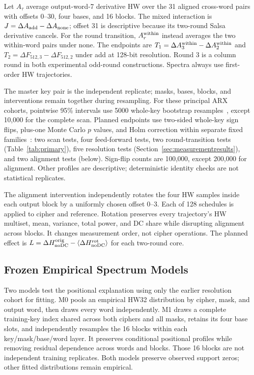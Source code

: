 \documentclass[electronics,article,submit,pdftex,oneauthor]{Definitions/mdpi}
\begin{document}
Let $A_\tau$ average output-word-7 derivative HW over the 31 aligned cross-word pairs with offsets 0--30, four bases, and 16 blocks. The mixed interaction is $J=\Delta A_{\rm add}-\Delta A_{\rm none}$; offset 31 is descriptive because its two-round Salsa derivative cancels. For the round transition, $A_r^{\rm within}$ instead averages the two within-word pairs under none. The endpoints are $T_1=\Delta A_3^{\rm within}-\Delta A_2^{\rm within}$ and $T_2=\Delta F_{512,3}-\Delta F_{512,2}$ under add at 128-bit resolution. Round 3 is a column round in both experimental odd-round constructions. Spectra always use first-order HW trajectories.

The master key pair is the independent replicate; masks, bases, blocks, and interventions remain together during resampling. For these principal ARX cohorts, pointwise 95\% intervals use 5000 whole-key bootstrap resamples~\citep{field2007}, except 10,000 for the complete scan. Planned endpoints use two-sided whole-key sign flips, plus-one Monte Carlo $p$ values, and Holm correction within separate fixed families~\citep{holm1979}: two scan tests, four feed-forward tests, two round-transition tests (Table~\ref{tab:primary}), five resolution tests (Section~\ref{sec:measurementresults}), and two alignment tests (below). Sign-flip counts are 100,000, except 200,000 for alignment. Other profiles are descriptive; deterministic identity checks are not statistical replicates.

The alignment intervention independently rotates the four HW samples inside each output block by a uniformly chosen offset 0--3. Each of 128 schedules is applied to cipher and reference. Rotation preserves every trajectory's HW multiset, mean, variance, total power, and DC share while disrupting alignment across blocks. It changes measurement order, not cipher operations. The planned effect is $L=\Delta H_{\rm noDC}^{\rm orig}-\langle\Delta H_{\rm noDC}^{\rm rot}\rangle$ for each two-round core.

\subsection{Frozen Empirical Spectrum Models}\label{sec:models}

Two models test the positional explanation using only the earlier resolution cohort for fitting. M0 pools an empirical HW32 distribution by cipher, mask, and output word, then draws every word independently. M1 draws a complete training-key index shared across both ciphers and all masks, retains its four base slots, and independently resamples the 16 blocks within each key/mask/base/word layer. It preserves conditional positional profiles while removing residual dependence across words and blocks. Those 16 blocks are not independent training replicates. Both models preserve observed support zeros; other fitted distributions remain empirical.
\end{document}
